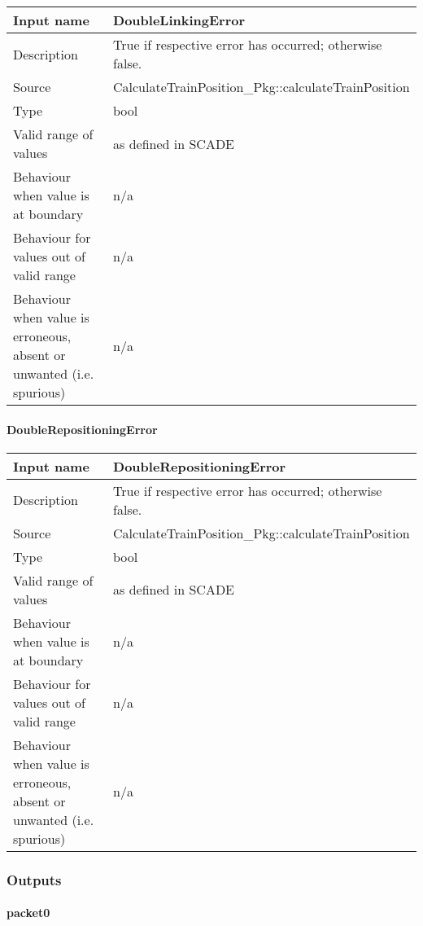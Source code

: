 \begin{longtable}{p{}p{}}
\toprule
Input name				& DoubleLinkingError \\
\midrule
Description				& True if respective error has occurred; otherwise false. \\
\midrule
Source					& CalculateTrainPosition\_Pkg::calculateTrainPosition \\ 
\midrule
Type					& bool \\
\midrule
Valid range of values	& as defined in SCADE \\
\midrule
Behaviour when value is at boundary	& n/a \\
\midrule
Behaviour for values out of valid range	& n/a \\
\midrule
Behaviour when value is erroneous, absent or unwanted (i.e. spurious) & n/a \\
\bottomrule
\end{longtable}

\paragraph{DoubleRepositioningError}

\begin{longtable}{p{}p{}}
\toprule
Input name				& DoubleRepositioningError \\
\midrule
Description				& True if respective error has occurred; otherwise false. \\
\midrule
Source					& CalculateTrainPosition\_Pkg::calculateTrainPosition \\ 
\midrule
Type					& bool \\
\midrule
Valid range of values	& as defined in SCADE \\
\midrule
Behaviour when value is at boundary	& n/a \\
\midrule
Behaviour for values out of valid range	& n/a \\
\midrule
Behaviour when value is erroneous, absent or unwanted (i.e. spurious) & n/a \\
\bottomrule
\end{longtable}


\subsubsection{Outputs}\label{s:provide_position_report_outputs}

\paragraph{packet0}

